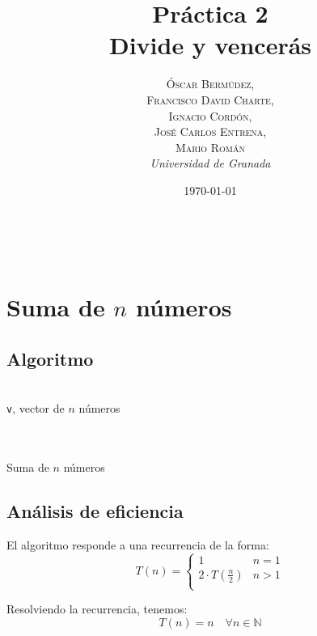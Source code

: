 \documentclass[a4paper, 11pt]{article} %
\title{\textbf{Práctica 2}\\ %
Divide y vencerás} %
\author{\textsc{Óscar Bermúdez,\\Francisco David Charte,\\Ignacio Cordón,\\José Carlos Entrena,\\Mario Román} %
\\{\textit{Universidad de Granada}}} %
\date{\today} %
\makeatletter
\renewcommand{\maketitle}{ %
\begin{flushright} %
{\LARGE\@title} %

\vspace{50pt} %

{\large\@author} %
\\\@date %

\vspace{40pt} %
\end{flushright}
}
\makeatother
\begin{document}
\maketitle %

\renewcommand{\abstractname}{Resumen} %
\begin{abstract}

\end{abstract}
{\parskip=2pt
\tableofcontents
}
\pagebreak

\section {Suma de $n$ números}
\subsection{Algoritmo}
\begin{algorithm}[H]
	\begin{algorithmic}[1]
		\REQUIRE \ \\
        	\texttt{v}, vector de $n$ números\\\
	\ELSE
    	\ENDIF \\\
	\end{algorithmic}
    \caption{Suma de $n$ números}
    \label{suma}
\end{algorithm}

\subsection{Análisis de eficiencia}
El algoritmo responde a una recurrencia de la forma:
\begin{equation}
 T(n)=\left\lbrace
	    \begin{array}{lr}
            1 & n=1\\
            2\cdot T\left(\frac{n}{2}\right) & n>1\\
            \end{array}
	    \right.
\end{equation}

Resolviendo la recurrencia, tenemos:
\begin{equation}
 T(n)=n\quad \forall n\in \mathbb{N}
\end{equation}
\end{document}
